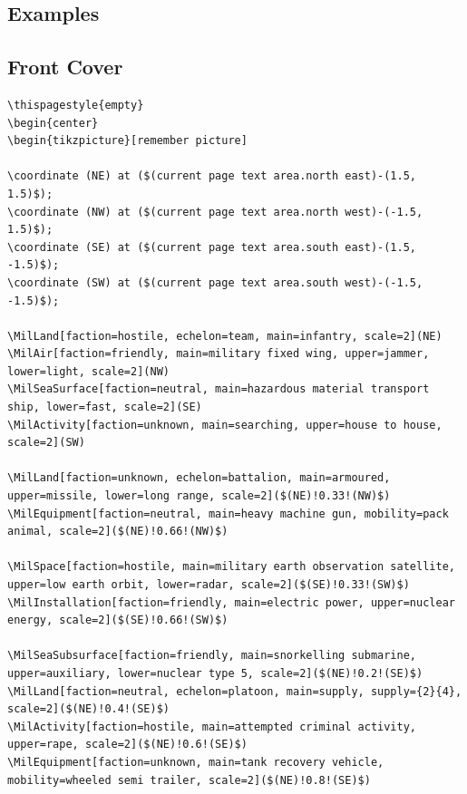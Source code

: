 \documentclass[a4paper, titlepage]{article}
\newenvironment{writett}{\ttfamily}{\par}
\begin{document}
\begin{landscape}

\section{Examples}

\subsection{Front Cover}

\begin{writett}
\fontsize{6}{0}\selectfont
\begin{verbatim}
\thispagestyle{empty}
\begin{center}
\begin{tikzpicture}[remember picture]

\coordinate (NE) at ($(current page text area.north east)-(1.5, 1.5)$);
\coordinate (NW) at ($(current page text area.north west)-(-1.5, 1.5)$);
\coordinate (SE) at ($(current page text area.south east)-(1.5, -1.5)$);
\coordinate (SW) at ($(current page text area.south west)-(-1.5, -1.5)$);

\MilLand[faction=hostile, echelon=team, main=infantry, scale=2](NE)
\MilAir[faction=friendly, main=military fixed wing, upper=jammer, lower=light, scale=2](NW)
\MilSeaSurface[faction=neutral, main=hazardous material transport ship, lower=fast, scale=2](SE)
\MilActivity[faction=unknown, main=searching, upper=house to house, scale=2](SW)

\MilLand[faction=unknown, echelon=battalion, main=armoured, upper=missile, lower=long range, scale=2]($(NE)!0.33!(NW)$)
\MilEquipment[faction=neutral, main=heavy machine gun, mobility=pack animal, scale=2]($(NE)!0.66!(NW)$)

\MilSpace[faction=hostile, main=military earth observation satellite, upper=low earth orbit, lower=radar, scale=2]($(SE)!0.33!(SW)$)
\MilInstallation[faction=friendly, main=electric power, upper=nuclear energy, scale=2]($(SE)!0.66!(SW)$)

\MilSeaSubsurface[faction=friendly, main=snorkelling submarine, upper=auxiliary, lower=nuclear type 5, scale=2]($(NE)!0.2!(SE)$)
\MilLand[faction=neutral, echelon=platoon, main=supply, supply={2}{4}, scale=2]($(NE)!0.4!(SE)$)
\MilActivity[faction=hostile, main=attempted criminal activity, upper=rape, scale=2]($(NE)!0.6!(SE)$)
\MilEquipment[faction=unknown, main=tank recovery vehicle, mobility=wheeled semi trailer, scale=2]($(NE)!0.8!(SE)$)


\end{verbatim}
\end{writett}
\end{landscape}
\end{document}
